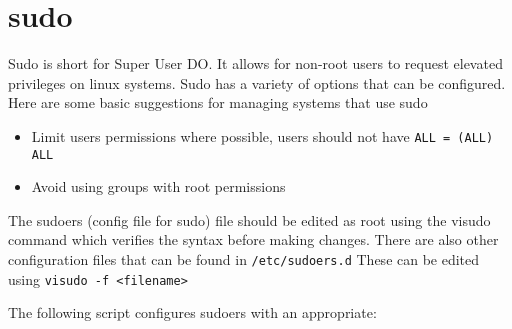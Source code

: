 \section{sudo}

Sudo is short for Super User DO.
It allows for non-root users to request elevated privileges on linux systems.
Sudo has a variety of options that can be configured.
Here are some basic suggestions for managing systems that use sudo

\begin{itemize}
	\item Limit users permissions where possible, users should not have \lstinline|ALL = (ALL) ALL|
	\item Avoid using groups with root permissions
\end{itemize}

The sudoers (config file for sudo) file should be edited as root using the visudo command which verifies the syntax before making changes.
There are also other configuration files that can be found in \lstinline|/etc/sudoers.d|
These can be edited using \lstinline|visudo -f <filename>|

The following script configures sudoers with an appropriate:



